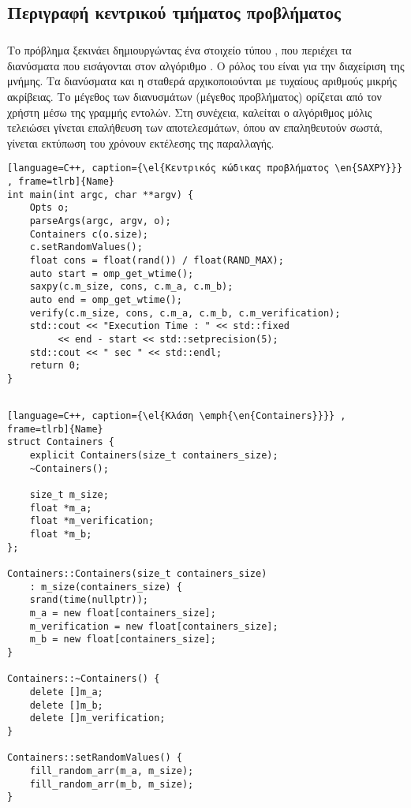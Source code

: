 \subsection{Περιγραφή κεντρικού τμήματος προβλήματος }
\subparagraph{}
Το πρόβλημα ξεκινάει δημιουργώντας ένα στοιχείο τύπου \emph{}, που περιέχει τα διανύσματα που εισάγονται
στον αλγόριθμο . Ο ρόλος του  είναι για την διαχείριση της  μνήμης. Τα
διανύσματα και η σταθερά  αρχικοποιούνται με τυχαίους αριθμούς μικρής ακρίβειας. Το μέγεθος των
διανυσμάτων (μέγεθος προβλήματος) ορίζεται από τον χρήστη μέσω της γραμμής εντολών. Στη συνέχεια, καλείται ο αλγόριθμος
 μόλις τελειώσει γίνεται επαλήθευση των αποτελεσμάτων, όπου αν επαληθευτούν σωστά, γίνεται εκτύπωση του
χρόνουν εκτέλεσης της παραλλαγής.
\\
\begin{spacing}{1.0}
\begin{lstlisting}[language=C++, caption={\el{Κεντρικός κώδικας προβλήματος \en{SAXPY}}} , frame=tlrb]{Name}
int main(int argc, char **argv) {
    Opts o;
    parseArgs(argc, argv, o);
    Containers c(o.size);
    c.setRandomValues();
    float cons = float(rand()) / float(RAND_MAX);
    auto start = omp_get_wtime();
    saxpy(c.m_size, cons, c.m_a, c.m_b);
    auto end = omp_get_wtime();
    verify(c.m_size, cons, c.m_a, c.m_b, c.m_verification);
    std::cout << "Execution Time : " << std::fixed
         << end - start << std::setprecision(5);
    std::cout << " sec " << std::endl;
    return 0;
}
   
\end{lstlisting}
\end{spacing}
\clearpage
{}
\begin{spacing}{0.8}
\begin{lstlisting}[language=C++, caption={\el{Κλάση \emph{\en{Containers}}}} , frame=tlrb]{Name}
struct Containers {
    explicit Containers(size_t containers_size);
    ~Containers();

    size_t m_size;
    float *m_a;
    float *m_verification;
    float *m_b;
};     

Containers::Containers(size_t containers_size)
    : m_size(containers_size) {
    srand(time(nullptr));
    m_a = new float[containers_size];
    m_verification = new float[containers_size];
    m_b = new float[containers_size];
}

Containers::~Containers() {
    delete []m_a;
    delete []m_b;
    delete []m_verification;
}

Containers::setRandomValues() {
    fill_random_arr(m_a, m_size);
    fill_random_arr(m_b, m_size);
}
\end{lstlisting}
\end{spacing}

